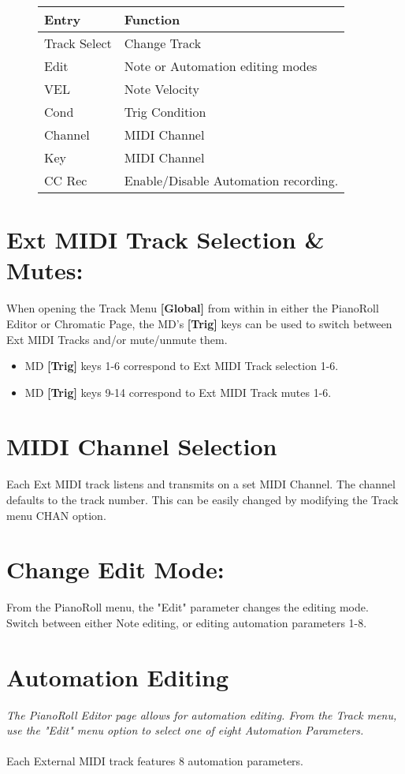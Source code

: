 \begin{figure}[hb]
    \begin{tabular}{|l|l|}
    \hline
    \rowcolor[HTML]{C0C0C0} 
    Entry        & Function \\ \hline
    Track Select & Change Track \\ \hline
    Edit         & Note or Automation editing modes\\ \hline
    VEL         & Note Velocity\\ \hline
    Cond        & Trig Condition\\ \hline
    Channel     & MIDI Channel\\ \hline
    Key         & MIDI Channel\\ \hline
    CC Rec      & Enable/Disable Automation recording.\\ \hline
    \end{tabular}
\end{figure}
\section{Ext MIDI Track Selection \& Mutes:}
When opening the Track Menu \textbf{[Global]} from within in either the PianoRoll Editor or Chromatic Page, the MD's \textbf{[Trig]} keys can be used to switch between Ext MIDI Tracks and/or mute/unmute them. 
\begin{itemize}
    \item MD \textbf{[Trig]} keys 1-6 correspond to Ext MIDI Track selection 1-6.
    \item MD \textbf{[Trig]} keys 9-14 correspond to Ext MIDI Track mutes 1-6.
\end{itemize}

\section{MIDI Channel Selection}
Each Ext MIDI track listens and transmits on a set MIDI Channel. The channel defaults to the track number. This can be easily changed by modifying the Track menu CHAN option.\\
\section{Change Edit Mode:}
From the PianoRoll menu, the "Edit" parameter changes the editing mode. Switch between either Note editing, or editing automation parameters 1-8.
\newpage

\section{Automation Editing}
\textit{The PianoRoll Editor page allows for automation editing. From the Track menu, use the "Edit" menu option to select one of eight Automation Parameters.}
\\\\
Each External MIDI track features 8 automation parameters.\\
